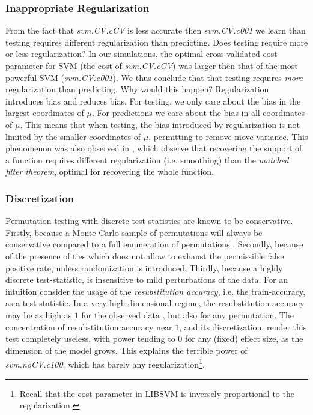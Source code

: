 \documentclass[]{bio}
\begin{document}
\subsubsection{Inappropriate Regularization}
From the fact that \emph{svm.CV.cCV} is less accurate then \emph{svm.CV.c001} we learn than testing requires different regularization than predicting.
Does testing require more or less regularization?
In our simulations, the optimal cross validated cost parameter for SVM (the cost of \emph{svm.CV.cCV}) was larger then that of the most powerful SVM (\emph{svm.CV.c001}).
We thus conclude that that testing requires \emph{more} regularization  than predicting. 
Why would this happen?
Regularization introduces bias and reduces bias. 
For testing, we only care about the bias in the largest coordinates of $\mu$. 
For predictions we care about the bias in all coordinates of $\mu$. 
This means that when testing, the bias introduced by regularization is not limited by the smaller coordinates of $\mu$, permitting to remove move variance. 
This phenomenon was also observed in \cite{cheng2017multiple}, which observe that recovering the support of a function requires different regularization (i.e. smoothing) than the \emph{matched filter theorem}, optimal for recovering the whole function.


\subsubsection{Discretization}
Permutation testing with discrete test statistics are known to be conservative.
Firstly, because a Monte-Carlo sample of permutations will always be conservative compared to a full enumeration of permutations \cite{hemerik_exact_2014}.
Secondly, because of the presence of ties which does not allow to exhaust the permissible false positive rate, unless randomization is introduced.
Thirdly, because a highly discrete test-statistic, is insensitive to mild perturbations of the data.
For an intuition consider the usage of the \emph{resubstitution accuracy}, i.e. the train-accuracy, as a test statistic. 
In a very high-dimensional regime, the resubstitution accuracy may be as high as $1$ for the observed data \cite[Theorem 1]{mclachlan_bias_1976}, but also for any permutation.
The concentration of resubstitution accuracy near $1$, and its discretization, render this test completely useless, with power tending to $0$ for any (fixed) effect size, as the dimension of the model grows. 
This explains the terrible power of \emph{svm.noCV.c100}, which has barely any regularization\footnote{Recall that the cost parameter in LIBSVM is inversely proportional to the regularization.}. 
\end{document}
